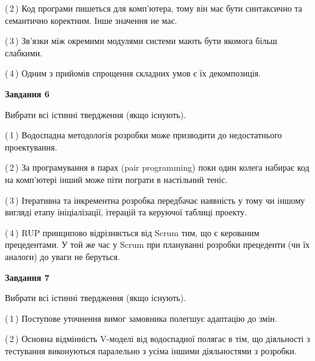 \documentclass[10pt, ukrainian]{article}
\begin{document}
{\begin {large}
(\,2\,) Код програми пишеться для комп'ютера, тому він має бути синтаксично та семантично коректним. Інше значення не має. %



(\,3\,) Зв'язки між окремими модулями системи мають бути якомога більш слабкими. %



(\,4\,) Одним з прийомів спрощення складних умов є їх декомпозиція. %

\newpage

{\begin {center}\textbf{Завдання 6}\end {center}}\par
Вибрати всі істинні твердження (якщо існують).\par
\vspace{2mm}



(\,1\,) Водоспадна методологія розробки може призводити до недостатнього проектування. %



(\,2\,) За програмування в парах (pair programming) поки один колега набирає код на комп'ютері інший може піти пограти в настільний теніс. %



(\,3\,) Ітеративна та інкрементна розробка передбачає наявність у тому чи іншому вигляді етапу ініціалізації, ітерацій та керуючої таблиці проекту. %



(\,4\,) RUP принципово відрізняється від Scrum тим, що є керованим прецедентами. У той же час у Scrum при плануванні розробки прецеденти (чи їх аналоги) до уваги не беруться. %


{\begin {center}\textbf{Завдання 7}\end {center}}\par
Вибрати всі істинні твердження (якщо існують).\par
\vspace{2mm}



(\,1\,) Поступове уточнення вимог замовника полегшує адаптацію до змін. %



(\,2\,) Основна відмінність V-моделі від водоспадної полягає в тім, що діяльності з тестування виконуються паралельно з усіма іншими діяльностями з розробки. %




\end{large}}
\end{document}
